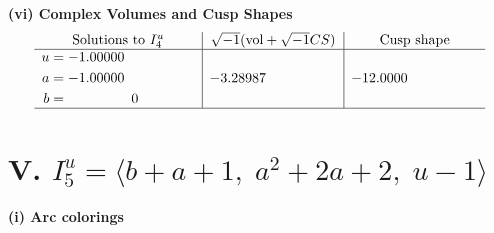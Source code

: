 \documentclass[1p]{elsarticle_modified}
\theoremstyle{definition}
\newcommand{\I}{\sqrt{-1}}
\begin{document}
\newpage\flushleft \textbf{(vi) Complex Volumes and Cusp Shapes}
$$\begin{array}{c|c|c}  
\text{Solutions to }I^u_{4}& \I (\text{vol} + \sqrt{-1}CS) & \text{Cusp shape}\\
 \hline 
\begin{aligned}
u &= -1.00000\phantom{ +0.000000I} \\
a &= -1.00000\phantom{ +0.000000I} \\
b &= \phantom{-0.000000 } 0\end{aligned}
 & -3.28987\phantom{ +0.000000I} & -12.0000\phantom{ +0.000000I}\\
 \hline 
 \end{array}$$\newpage\newpage\renewcommand{\arraystretch}{1}
\centering \section*{V. $I^u_{5}= \langle b+a+1,\;a^2+2 a+2,\;u-1 \rangle$}
\flushleft \textbf{(i) Arc colorings}\\
\end{document}
